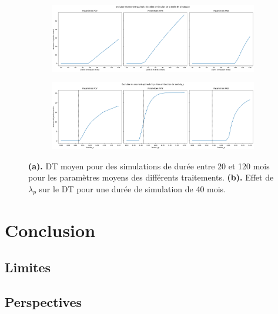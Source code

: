 \documentclass[12pt]{article}
\begin{document}
\begin{figure}

    \centering
    \begin{subfigure}[t]{\textwidth}
        \centering
        \includegraphics[width=\textwidth]{Image/duree_simu.png} 
        \caption{} \label{fig:duree_simu}
    \end{subfigure}

    \vspace{0.5cm}

    \begin{subfigure}[t]{\textwidth}
        \centering
        \includegraphics[width=\textwidth]{Image/effet_lambda_moment.png}
        \caption{} \label{fig:effet_lambda_moment}
    \end{subfigure}

    \caption{\textbf{(a).} DT moyen pour des simulations de durée entre 20 et 120 mois pour les paramètres moyens des différents traitements. \textbf{(b).} Effet de $\lambda_{p}$ sur le DT pour une durée de simulation de 40 mois.}
\end{figure}

\section{Conclusion}
\subsection{Limites}
\subsection{Perspectives}
\end{document}

